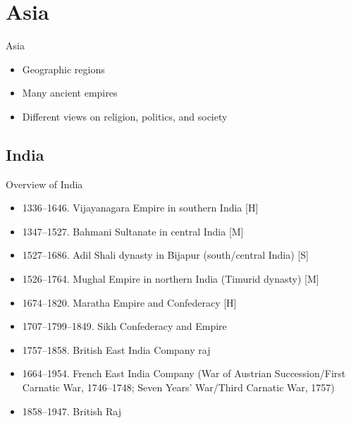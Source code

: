 


\section{Asia}
\begin{frame}{Asia}
	\begin{itemize}
		\item<1,3->Geographic regions
		\item<3->Many ancient empires
		\item<4->Different views on religion, politics, and society
	\end{itemize}
\end{frame}

\subsection{India}
\begin{frame}{Overview of India}
	\begin{itemize}
		\item<1-2,4-5,7-10,12->1336--1646. Vijayanagara Empire in southern India [H]
		\item<2,4-5,7-10,12->1347--1527. Bahmani Sultanate in central India [M]
		\item<4-5,7-10,12->1527--1686. Adil Shali dynasty in Bijapur (south/central India) [S]
		\item<5,7-10,12->1526--1764. Mughal Empire in northern India (Timurid dynasty) [M]
		\item<7-10,12->1674--1820. Maratha Empire and Confederacy [H]
		\item<8-10,12->1707--1799--1849. Sikh Confederacy and Empire
		\item<9-10,12->1757--1858. British East India Company raj
		\item<10,12->1664--1954. French East India Company (War of Austrian Succession/First Carnatic War, 1746--1748; Seven Years' War/Third Carnatic War, 1757)
		\item<12->1858--1947. British Raj
	\end{itemize}
\end{frame}

